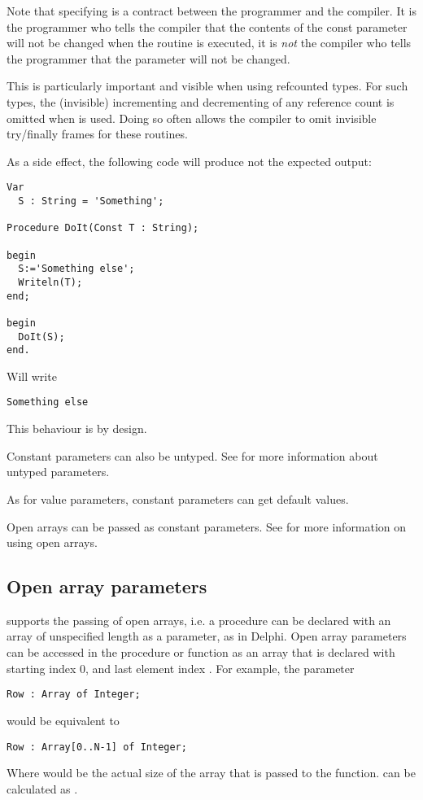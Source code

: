 \begin{remark}
Note that specifying  is a contract between the programmer and the
compiler. It is the programmer who tells the compiler that the contents of
the const parameter will not be changed when the routine is executed, it is 
{\em not} the compiler who tells the programmer that the parameter will not be 
changed. 

This is particularly important and visible when using refcounted types. 
For such types, the (invisible) incrementing and decrementing of any reference 
count is omitted when  is used. Doing so often allows the compiler 
to omit invisible try/finally frames for these routines.

As a side effect, the following code will produce not the expected output:
\begin{verbatim}
Var
  S : String = 'Something';

Procedure DoIt(Const T : String);

begin
  S:='Something else';
  Writeln(T);
end;

begin
  DoIt(S);
end.
\end{verbatim}
Will write 
\begin{verbatim}
Something else
\end{verbatim}
This behaviour is by design.
\end{remark}

Constant parameters can also be untyped. See  for more
information about untyped parameters.

As for value parameters, constant parameters can get default values.

Open arrays can be passed as constant parameters. See  for
more information on using open arrays.

\subsection{Open array parameters}
\label{se:openarray}
\fpc supports the passing of open arrays, i.e. a procedure can be declared
with an array of unspecified length as a parameter, as in Delphi.
Open array parameters can be accessed in the procedure or function as an
array that is declared with starting index 0, and last element
index .
For example, the parameter
\begin{verbatim}
Row : Array of Integer;
\end{verbatim}
would be equivalent to
\begin{verbatim}
Row : Array[0..N-1] of Integer;
\end{verbatim}
Where   would be the actual size of the array that is passed to the
function.  can be calculated as .

